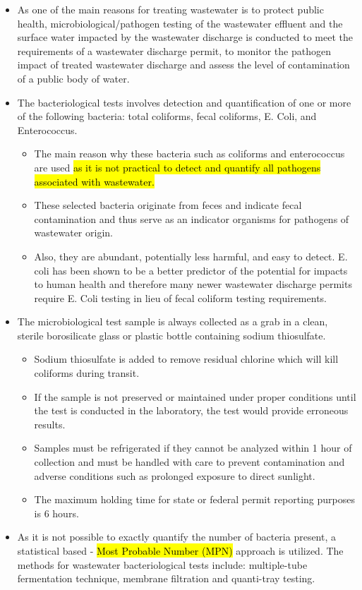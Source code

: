 \begin{enumerate}[1.]
				\begin{itemize}
					\item As one of the main reasons for treating wastewater is to protect public health, microbiological/pathogen testing of the wastewater effluent and the surface water impacted by the wastewater discharge is conducted to meet the requirements of a wastewater discharge permit, to monitor the pathogen impact of treated wastewater discharge and assess the level of contamination of a public body of water.
					\item The bacteriological tests involves detection and quantification of one or more of the following bacteria:  total coliforms, fecal coliforms, E. Coli, and Enterococcus.  
					      \begin{itemize}
					      	\item The main reason why these bacteria such as coliforms and enterococcus are used \hl{as it is not practical to detect and quantify all pathogens associated with wastewater.}  
					      	\item These selected bacteria originate from feces and indicate fecal contamination and thus serve as an indicator organisms for pathogens of wastewater origin.  
					      	\item Also, they are abundant, potentially less harmful, and easy to detect.  E. coli has been shown to be a better predictor of the potential for impacts to human health and therefore many newer wastewater discharge permits require E. Coli testing in lieu of fecal coliform testing requirements.
					      \end{itemize}
					\item The microbiological test sample is always collected as a grab in a clean, sterile borosilicate glass or plastic bottle containing sodium thiosulfate. 
					      \begin{itemize}
					      	\item Sodium thiosulfate is added to remove residual chlorine which will kill coliforms during transit. 
					      	\item If the sample is not preserved or maintained under proper conditions until the test is conducted in the laboratory, the test would provide erroneous results.
					      	\item Samples must be refrigerated if they cannot be analyzed within 1 hour of collection and must be handled with care to prevent contamination and adverse conditions such as prolonged exposure to direct sunlight.
					      	\item The maximum holding time for state or federal permit reporting purposes is 6 hours. 
					      \end{itemize} 
					\item As it is not possible to exactly quantify the number of bacteria present, a statistical based - \hl{Most Probable Number (MPN)} approach is utilized.  The methods for wastewater bacteriological tests include:  multiple-tube fermentation technique, membrane filtration and quanti-tray testing. 
				\end{itemize}
			\end{enumerate}

